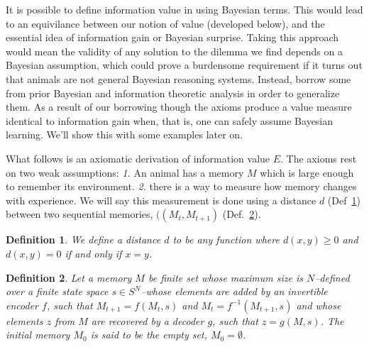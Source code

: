 \documentclass[9pt,twocolumn,twoside]{pnas-new}
\newtheorem{definition}{Definition}
\begin{document}


It is possible to define information value in using Bayesian terms. This would lead to an equivilance between our notion of value (developed below), and the essential idea of information gain or Bayesian surprise. Taking this approach would mean the validity of any solution to the dilemma we find depends on a Bayesian assumption, which could prove a burdensome requirement if it turns out that animals are not general Bayesian reasoning systems. Instead, borrow some from prior Bayesian and information theoretic analysis in order to generalize them. As a result of our borrowing though the axioms produce a value measure identical to information gain when, that is, one can safely assume Bayesian learning. We'll show this with some examples later on.

What follows is an axiomatic derivation of information value $E$. The axioms rest on two weak assumptions: \textit{1.} An animal has a memory $M$ which is large enough to remember its environment. \textit{2.} there is a way to measure how memory changes with experience. We will say this measurement is done using a distance $d$ (Def~\ref{def:distance}) between two sequential memories, $((M_{t}, M_{t+1})$ (Def.~\ref{def:memory}). 

\begin{definition}
    \label{def:distance}
    We define a distance $d$ to be any function where $d(x,y) \geq 0$ and $d(x,y) = 0$ if and only if $x = y$.
\end{definition}

\begin{definition}
    \label{def:memory}
    Let a memory $M$ be finite set whose maximum size is $N$--defined over a finite state space $s \in S^N$--whose elements are added by an invertible encoder $f$, such that $M_{t+1} = f(M_{t}, s)$ and $M_{t} = f^{-1}(M_{t+1}, s)$ and whose elements $z$ from $M$ are recovered by a decoder $g$, such that $z = g(M, s)$. The initial memory $M_{0}$ is said to be the empty set, $M_{0} = \emptyset$.
\end{definition}
\end{document}
